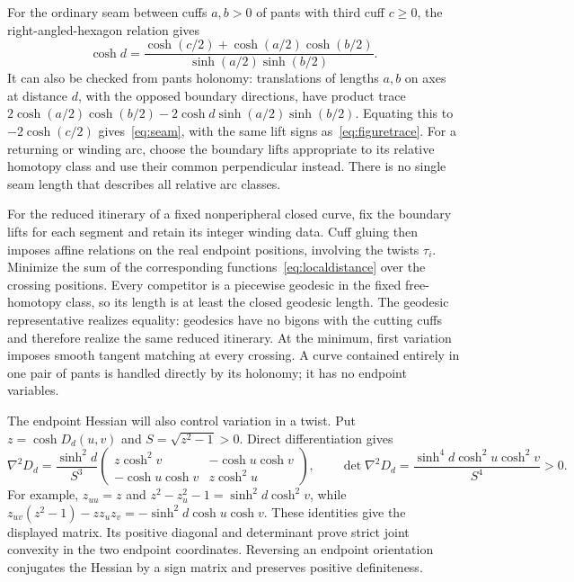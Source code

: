 For the ordinary seam between cuffs $a,b>0$ of pants with third cuff
$c\geq0$, the right-angled-hexagon relation gives
\begin{equation}
 \cosh d=\frac{\cosh(c/2)+\cosh(a/2)\cosh(b/2)}
                    {\sinh(a/2)\sinh(b/2)}.
 \label{eq:seam}
\end{equation}
It can also be checked from pants holonomy: translations of lengths
$a,b$ on axes at distance $d$, with the opposed boundary directions,
have product trace
$2\cosh(a/2)\cosh(b/2)-2\cosh d\sinh(a/2)\sinh(b/2)$.
Equating this to $-2\cosh(c/2)$ gives~\eqref{eq:seam}, with the
same lift signs as~\eqref{eq:figuretrace}.
For a returning or winding arc, choose the boundary lifts appropriate to
its relative homotopy class and use their common perpendicular instead.
There is no single seam length that describes all relative arc classes.

For the reduced itinerary of a fixed nonperipheral closed curve, fix the
boundary lifts for each segment and retain its integer winding data.
Cuff gluing then imposes affine relations on the real endpoint positions,
involving the twists $\tau_i$. Minimize the sum of the corresponding
functions~\eqref{eq:localdistance} over the crossing positions. Every
competitor is a piecewise geodesic in the fixed free-homotopy class, so its
length is at least the closed geodesic length. The geodesic representative
realizes equality: geodesics have no bigons with the cutting cuffs and
therefore realize the same reduced itinerary. At the minimum, first
variation imposes smooth tangent matching at every crossing. A curve
contained entirely in one pair of pants is handled directly by its
holonomy; it has no endpoint variables.

The endpoint Hessian will also control variation in a twist. Put
$z=\cosh D_d(u,v)$ and $S=\sqrt{z^2-1}>0$. Direct differentiation gives
\begin{equation}
 \nabla^2D_d=\frac{\sinh^2d}{S^3}
 \begin{pmatrix}
 z\cosh^2v&-\cosh u\cosh v\\
 -\cosh u\cosh v&z\cosh^2u
 \end{pmatrix},\qquad
 \det\nabla^2D_d=
 \frac{\sinh^4d\cosh^2u\cosh^2v}{S^4}>0.
 \label{eq:localdistancehessian}
\end{equation}
For example, $z_{uu}=z$ and
$z^2-z_u^2-1=\sinh^2d\cosh^2v$, while
$z_{uv}(z^2-1)-zz_uz_v=-\sinh^2d\cosh u\cosh v$.
These identities give the displayed matrix. Its positive diagonal and
determinant prove strict joint convexity in the two endpoint coordinates.
Reversing an endpoint orientation conjugates the Hessian by a sign matrix
and preserves positive definiteness.

